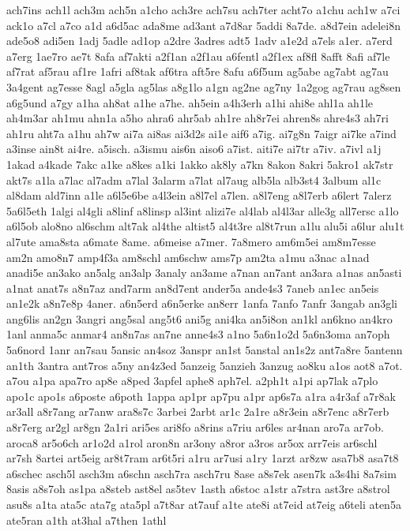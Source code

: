 {ach7ins
ach1l
ach3m
ach5n
a1cho
ach3re
ach7su
ach7ter
acht7o
a1chu
ach1w
a7ci
ack1o
a7cl
a7co
a1d
a6d5ac
ada8me
ad3ant
a7d8ar
5addi
8a7de.
a8d7ein
adelei8n
ade5o8
adi5en
1adj
5adle
ad1op
a2dre
3adres
adt5
1adv
a1e2d
a7els
a1er.
a7erd
a7erg
1ae7ro
ae7t
8afa
af7akti
a2f1an
a2f1au
a6fentl
a2f1ex
af8fl
8afft
8afi
af7le
af7rat
af5rau
af1re
1afri
af8tak
af6tra
aft5re
8afu
a6f5um
ag5abe
ag7abt
ag7au
3a4gent
ag7esse
8agl
a5gla
ag5las
a8g1lo
a1gn
ag2ne
ag7ny
1a2gog
ag7rau
ag8sen
a6g5und
a7gy
a1ha
ah8at
a1he
a7he.
ah5ein
a4h3erh
a1hi
ahi8e
ahl1a
ah1le
ah4m3ar
ah1mu
ahn1a
a5ho
ahra6
ahr5ab
ah1re
ah8r7ei
ahren8s
ahre4s3
ah7ri
ah1ru
aht7a
a1hu
ah7w
ai7a
ai8as
ai3d2s
ai1e
aif6
a7ig.
ai7g8n
7aigr
ai7ke
a7ind
a3inse
ain8t
ai4re.
a5isch.
a3ismu
ais6n
aiso6
a7ist.
aiti7e
ai7tr
a7iv.
a7ivl
a1j
1akad
a4kade
7akc
a1ke
a8kes
a1ki
1akko
ak8ly
a7kn
8akon
8akri
5akro1
ak7str
akt7s
a1la
a7lac
al7adm
a7lal
3alarm
a7lat
al7aug
alb5la
alb3st4
3album
al1c
al8dam
ald7inn
a1le
a6l5e6be
a4l3ein
a8l7el
a7len.
a8l7eng
a8l7erb
a6lert
7alerz
5a6l5eth
1algi
al4gli
a8linf
a8linsp
al3int
alizi7e
al4lab
al4l3ar
alle3g
all7ersc
a1lo
a6l5ob
alo8no
al6schm
alt7ak
al4the
altist5
al4t3re
al8t7run
a1lu
alu5i
a6lur
alu1t
al7ute
ama8sta
a6mate
8ame.
a6meise
a7mer.
7a8mero
am6m5ei
am8m7esse
am2n
amo8n7
amp4f3a
am8schl
am6schw
ams7p
am2ta
a1mu
a3nac
a1nad
anadi5e
an3ako
an5alg
an3alp
3analy
an3ame
a7nan
an7ant
an3ara
a1nas
an5asti
a1nat
anat7s
a8n7az
and7arm
an8d7ent
ander5a
ande4s3
7aneb
an1ec
an5eis
an1e2k
a8n7e8p
4aner.
a6n5erd
a6n5erke
an8err
1anfa
7anfo
7anfr
3angab
an3gli
ang6lis
an2gn
3angri
ang5sal
ang5t6
ani5g
ani4ka
an5i8on
an1kl
an6kno
an4kro
1anl
anma5c
anmar4
an8n7as
an7ne
anne4s3
a1no
5a6n1o2d
5a6n3oma
an7oph
5a6nord
1anr
an7sau
5ansic
an4soz
3anspr
an1st
5anstal
an1s2z
ant7a8re
5antenn
an1th
3antra
ant7ros
a5ny
an4z3ed
5anzeig
5anzieh
3anzug
ao8ku
a1os
aot8
a7ot.
a7ou
a1pa
apa7ro
ap8e
a8ped
3apfel
aphe8
aph7el.
a2ph1t
a1pi
ap7lak
a7plo
apo1c
apo1s
a6poste
a6poth
1appa
ap1pr
ap7pu
a1pr
ap6s7a
a1ra
a4r3af
a7r8ak
ar3all
a8r7ang
ar7anw
ara8s7c
3arbei
2arbt
ar1c
2a1re
a8r3ein
a8r7enc
a8r7erb
a8r7erg
ar2gl
ar8gn
2a1ri
ari5es
ari8fo
a8rins
a7riu
ar6les
ar4nan
aro7a
ar7ob.
aroca8
ar5o6ch
ar1o2d
a1rol
aron8n
ar3ony
a8ror
a3ros
ar5ox
arr7eis
ar6schl
ar7sh
8artei
art5eig
ar8t7ram
ar6t5ri
a1ru
ar7usi
a1ry
1arzt
ar8zw
asa7b8
asa7t8
a6schec
asch5l
asch3m
a6schn
asch7ra
asch7ru
8ase
a8s7ek
asen7k
a3s4hi
8a7sim
8asis
a8s7oh
as1pa
a8steb
ast8el
as5tev
1asth
a6stoc
a1str
a7stra
ast3re
a8strol
asu8s
a1ta
ata5c
ata7g
ata5pl
a7t8ar
at7auf
a1te
ate8i
at7eid
at7eig
a6teli
aten5a
ate5ran
a1th
at3hal
a7then
1athl
}
